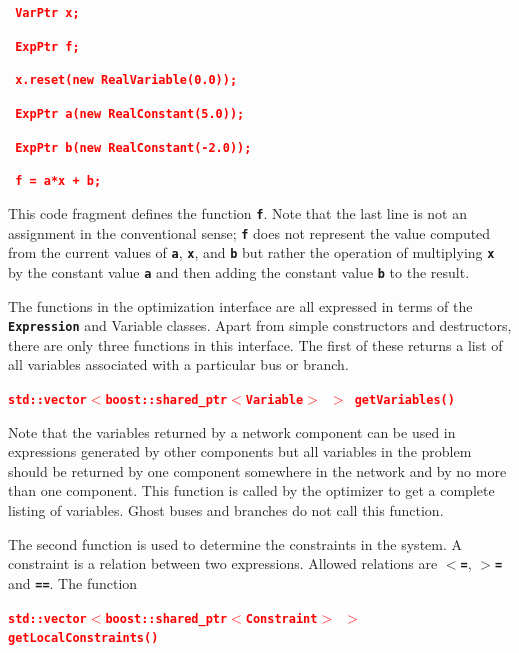 \documentclass[12pt]{report} %
\begin{document}
\textcolor{red}{\texttt{\textbf{    VarPtr x;}}}

\textcolor{red}{\texttt{\textbf{    ExpPtr f;}}}

\textcolor{red}{\texttt{\textbf{    x.reset(new RealVariable(0.0));}}}

\textcolor{red}{\texttt{\textbf{    ExpPtr a(new RealConstant(5.0));}}}

\textcolor{red}{\texttt{\textbf{    ExpPtr b(new RealConstant(-2.0));}}}

\textcolor{red}{\texttt{\textbf{    f = a*x + b;}}}

This code fragment defines the function \texttt{\textbf{f}}. Note that the last line is not an assignment in the conventional sense; \texttt{\textbf{f}} does not represent the value computed from the current values of \texttt{\textbf{a}}, \texttt{\textbf{x}}, and \texttt{\textbf{b}} but rather the operation of multiplying \texttt{\textbf{x}} by the constant value \texttt{\textbf{a}} and then adding the constant value \texttt{\textbf{b}} to the result.

The functions in the optimization interface are all expressed in terms of the \texttt{\textbf{Expression}} and Variable classes. Apart from simple constructors and destructors, there are only three functions in this interface. The first of these returns a list of all variables associated with a particular bus or branch.

\textcolor{red}{\texttt{\textbf{std::vector$\boldsymbol{\mathrm{<}}$boost::shared\_ptr$\boldsymbol{\mathrm{<}}$Variable$\boldsymbol{\mathrm{>}}$ $\boldsymbol{\mathrm{>}}$ getVariables()}}}

Note that the variables returned by a network component can be used in expressions generated by other components but all variables in the problem should be returned by one component somewhere in the network and by no more than one component. This function is called by the optimizer to get a complete listing of variables. Ghost buses and branches do not call this function.

The second function is used to determine the constraints in the system. A constraint is a relation between two expressions. Allowed relations are \texttt{\textbf{$\boldsymbol{\mathrm{<}}$=}}, \texttt{\textbf{$\boldsymbol{\mathrm{>}}$=}} and \texttt{\textbf{==}}. The function

\textcolor{red}{\texttt{\textbf{std::vector$\boldsymbol{\mathrm{<}}$boost::shared\_ptr$\boldsymbol{\mathrm{<}}$Constraint$\boldsymbol{\mathrm{>}}$ $\boldsymbol{\mathrm{>}}$ getLocalConstraints()}}}
\end{document}
